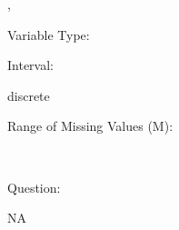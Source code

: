\documentclass[
]{article}
\begin{document}
,

\begin{minipage}[t]{0.3\linewidth}

\colorbox{mypink1}{}

\end{minipage}%
\begin{minipage}[t]{0.7\linewidth}

\colorbox{mypink1}{\makebox[\textwidth]{\strut\bfseries\color{black}  
 }}

\end{minipage}

\begin{minipage}[t]{0.3\linewidth}

Variable Type:

\end{minipage}%
\begin{minipage}[t]{0.7\linewidth}

\end{minipage}

\begin{minipage}[t]{0.3\linewidth}

Interval:

\end{minipage}%
\begin{minipage}[t]{0.7\linewidth}

discrete

\end{minipage}

\begin{minipage}[t]{0.3\linewidth}

Range of Missing Values (M):

\end{minipage}%
\begin{minipage}[t]{0.7\linewidth}

~

\end{minipage}

\begin{minipage}[t]{0.3\linewidth}

Question:

\end{minipage}%
\begin{minipage}[t]{0.7\linewidth}

NA

\end{minipage}
\end{document}
